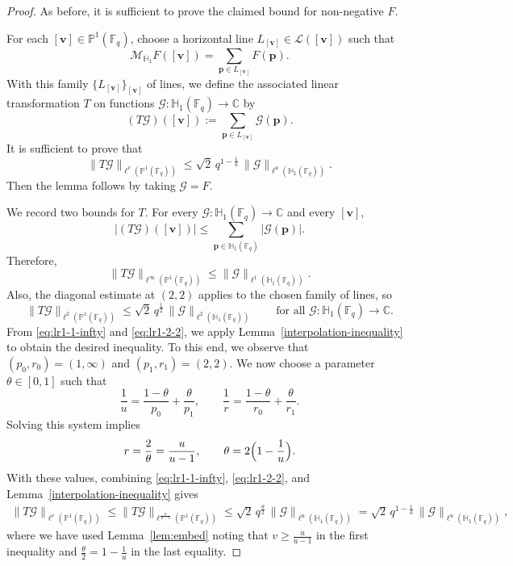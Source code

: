 \documentclass[11pt]{article}
\newcommand{\cL}{\mathcal{L}}
\newcommand{\1}{\mathbf 1}
\newcommand{\bfv}{\mathbf{v}}
\begin{document}
\begin{proof}
As before, it is sufficient to prove the claimed bound for non-negative $F$.

For each $[\mathbf{v}]\in\mathbb{P}^1(\mathbb{F}_q)$, choose a horizontal line $L_{[\bfv]}\in \cL([\bfv])$ such that 
\[
\mathcal{M}_{\mathbb{H}_1} F([\mathbf{v}])=\sum_{\mathbf{p}\in L_{[\mathbf{v}]}} F(\mathbf{p}).
\] 
With this family $\{L_{[\mathbf{v}]}\}_{[\mathbf{v}]}$ of lines, we define the associated linear transformation $T$ on functions $\mathcal{G}:\mathbb{H}_1(\mathbb{F}_q)\to\mathbb{C}$ by
\[
(T\mathcal{G})([\mathbf{v}]):= \sum_{\mathbf{p}\in L_{[\mathbf{v}]}} \mathcal{G}(\mathbf{p}).
\]
It is sufficient to prove that 
\[
\|T \mathcal{G}\|_{\ell^v(\mathbb{P}^1(\mathbb{F}_q))}
\le \sqrt{2}\,q^{1-\frac1u}\,
\|\mathcal{G}\|_{\ell^u(\mathbb{H}_1(\mathbb{F}_q))}.
\]
Then the lemma follows by taking $\mathcal G=F$.



We record two bounds for $T$.
For every $\mathcal{G}:\mathbb{H}_1(\mathbb{F}_q)\to\mathbb{C} $ and every $[\mathbf{v}]$,
\[
|(T\mathcal{G})([\mathbf{v}])|
\le
\sum_{\mathbf{p} \in\mathbb{H}_1(\mathbb{F}_q)} |\mathcal{G}(\mathbf{p})|.
\]
Therefore,
\begin{equation}\label{eq:lr1-1-infty}
\|T\mathcal{G}\|_{\ell^\infty(\mathbb{P}^1(\mathbb{F}_q))}
\le
\|\mathcal{G}\|_{\ell^1(\mathbb{H}_1(\mathbb{F}_q))}.
\end{equation}
Also, the diagonal estimate at $(2,2)$ applies to the chosen family of lines, so 
\begin{equation}\label{eq:lr1-2-2}
\|T\mathcal{G}\|_{\ell^2(\mathbb{P}^1(\mathbb{F}_q))}
\le \sqrt{2} \,q^{\frac12}\,\|\mathcal{G}\|_{\ell^2(\mathbb{H}_1(\mathbb{F}_q))}
\qquad\text{for all } \mathcal{G}:\mathbb{H}_1(\mathbb{F}_q)\to\mathbb{C}.
\end{equation}
From \eqref{eq:lr1-1-infty} and \eqref{eq:lr1-2-2}, we apply Lemma~\ref{interpolation-inequality} to obtain the desired inequality. 
To this end, we observe that \((p_0,r_0) = (1,\infty)\) and \((p_1,r_1) = (2,2)\).
We now choose a parameter \(\theta \in [0,1]\) such that
\[
\frac{1}{u} = \frac{1-\theta}{p_0} + \frac{\theta}{p_1},
    \qquad
\frac{1}{r} = \frac{1-\theta}{r_0} + \frac{\theta}{r_1}.
\]
Solving this system implies 
\[
r = \frac{2}{\theta} = \frac{u}{u-1},
    \qquad 
\theta = 2\Bigl(1 - \frac{1}{u}\Bigr).
\]
With these values, combining \eqref{eq:lr1-1-infty}, \eqref{eq:lr1-2-2}, and Lemma~\ref{interpolation-inequality} gives
\begin{align*}
   \|T\mathcal{G}\|_{\ell^{v}(\mathbb{P}^{1}(\mathbb{F}_q))}
   \le 
   \|T\mathcal{G}\|_{\ell^{\frac{u}{u-1}}(\mathbb{P}^{1}(\mathbb{F}_q))} 
   \le \sqrt{2}\, q^{\frac{\theta}{2}}\,
   \|\mathcal{G}\|_{\ell^{u}(\mathbb{H}_{1}(\mathbb{F}_q))} 
   =\sqrt{2}\,q^{1-\frac1u}\,
\|\mathcal{G}\|_{\ell^{u}(\mathbb{H}_1(\mathbb{F}_q))},
\end{align*}
where we have used Lemma~\ref{lem:embed} noting that $v \geq \frac{u}{u-1}$ in the first inequality and $\frac{\theta}{2}=1-\frac1u$ in the last equality. 
\end{proof}
\end{document}
